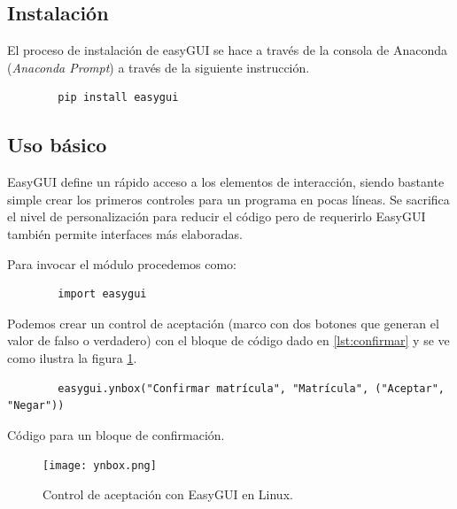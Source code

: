 \subsection{Instalación}

El proceso de instalación de easyGUI se hace a través de la consola de Anaconda (\textit{Anaconda Prompt}) a través de la siguiente
instrucción.

\begin{listing}[H]
    \begin{verbatim}
        pip install easygui
    \end{verbatim}
\end{listing}

\subsection{Uso básico}

EasyGUI define un rápido acceso a los elementos de interacción, siendo bastante simple crear los primeros controles
para un programa en pocas líneas. Se sacrifica el nivel de personalización para reducir el código pero de requerirlo
EasyGUI también permite interfaces más elaboradas.

Para invocar el módulo procedemos como:

\begin{listing}[H]
    \begin{verbatim}
        import easygui
    \end{verbatim}
\end{listing}

Podemos crear un control de aceptación (marco con dos botones que generan el valor de falso o verdadero)
con el bloque de código dado en \ref{lst:confirmar} y se ve como ilustra la figura
\ref{fig:ynbox}.

\begin{listing}[H]
    \begin{verbatim}
        easygui.ynbox("Confirmar matrícula", "Matrícula", ("Aceptar", "Negar"))
    \end{verbatim}
    \caption{Código para un bloque de confirmación.}
    \label{lst:confirmar}
\end{listing}

\begin{figure}
    \centering
    \texttt{[image: ynbox.png]}
    \caption{Control de aceptación con EasyGUI en Linux.}
    \label{fig:ynbox}
\end{figure}

